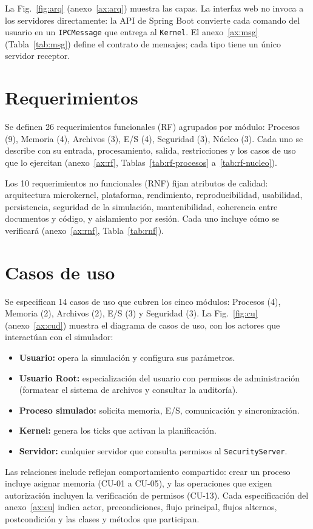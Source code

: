 \documentclass[conference]{IEEEtran}
\begin{document}
La Fig.~\ref{fig:arq} (anexo~\ref{ax:arq}) muestra las capas. La interfaz web no invoca a los servidores directamente: la API de Spring Boot convierte cada comando del usuario en un \texttt{IPCMessage} que entrega al \texttt{Kernel}. El anexo~\ref{ax:msg} (Tabla~\ref{tab:msg}) define el contrato de mensajes; cada tipo tiene un único servidor receptor.

\section{Requerimientos}\label{sec:req}
Se definen 26 requerimientos funcionales (RF) agrupados por módulo: Procesos (9), Memoria (4), Archivos (3), E/S (4), Seguridad (3), Núcleo (3). Cada uno se describe con su entrada, procesamiento, salida, restricciones y los casos de uso que lo ejercitan (anexo~\ref{ax:rf}, Tablas~\ref{tab:rf-procesos} a~\ref{tab:rf-nucleo}).

Los 10 requerimientos no funcionales (RNF) fijan atributos de calidad: arquitectura microkernel, plataforma, rendimiento, reproducibilidad, usabilidad, persistencia, seguridad de la simulación, mantenibilidad, coherencia entre documentos y código, y aislamiento por sesión. Cada uno incluye cómo se verificará (anexo~\ref{ax:rnf}, Tabla~\ref{tab:rnf}).

\section{Casos de uso}\label{sec:cu}
Se especifican 14 casos de uso que cubren los cinco módulos: Procesos (4), Memoria (2), Archivos (2), E/S (3) y Seguridad (3). La Fig.~\ref{fig:cu} (anexo~\ref{ax:cud}) muestra el diagrama de casos de uso, con los actores que interactúan con el simulador:
\begin{itemize}
\item \textbf{Usuario:} opera la simulación y configura sus parámetros.
\item \textbf{Usuario Root:} especialización del usuario con permisos de administración (formatear el sistema de archivos y consultar la auditoría).
\item \textbf{Proceso simulado:} solicita memoria, E/S, comunicación y sincronización.
\item \textbf{Kernel:} genera los ticks que activan la planificación.
\item \textbf{Servidor:} cualquier servidor que consulta permisos al \texttt{SecurityServer}.
\end{itemize}
Las relaciones \guillemotleft include\guillemotright{} reflejan comportamiento compartido: crear un proceso incluye asignar memoria (CU-01 a CU-05), y las operaciones que exigen autorización incluyen la verificación de permisos (CU-13). Cada especificación del anexo~\ref{ax:cu} indica actor, precondiciones, flujo principal, flujos alternos, postcondición y las clases y métodos que participan.
\end{document}
